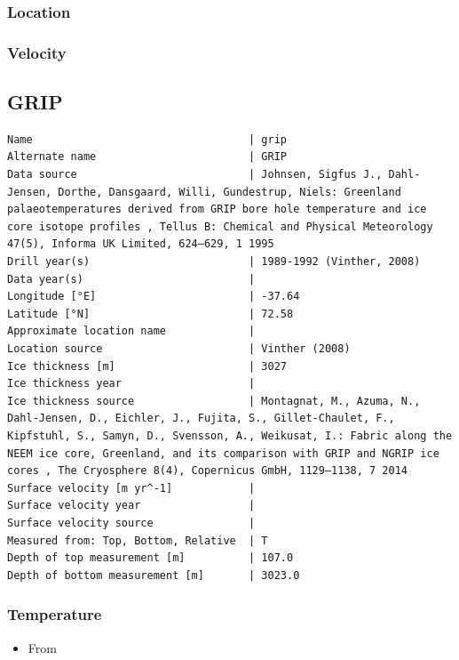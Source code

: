 \documentclass[article,a4paper,times,11pt,twoside]{article}
\begin{document}
\subsubsection{Location}
\label{sec:org9dd43f0}

\subsubsection{Velocity}
\label{sec:org24aabc6}
\clearpage
\subsection{GRIP}
\label{sec:orgd58e850}
\begin{verbatim}
Name                                  | grip
Alternate name                        | GRIP
Data source                           | Johnsen, Sigfus J., Dahl-Jensen, Dorthe, Dansgaard, Willi, Gundestrup, Niels: Greenland palaeotemperatures derived from GRIP bore hole temperature and ice core isotope profiles , Tellus B: Chemical and Physical Meteorology 47(5), Informa UK Limited, 624–629, 1 1995 
Drill year(s)                         | 1989-1992 (Vinther, 2008)
Data year(s)                          | 
Longitude [°E]                        | -37.64
Latitude [°N]                         | 72.58
Approximate location name             | 
Location source                       | Vinther (2008)
Ice thickness [m]                     | 3027
Ice thickness year                    | 
Ice thickness source                  | Montagnat, M., Azuma, N., Dahl-Jensen, D., Eichler, J., Fujita, S., Gillet-Chaulet, F., Kipfstuhl, S., Samyn, D., Svensson, A., Weikusat, I.: Fabric along the NEEM ice core, Greenland, and its comparison with GRIP and NGRIP ice cores , The Cryosphere 8(4), Copernicus GmbH, 1129–1138, 7 2014 
Surface velocity [m yr^-1]            | 
Surface velocity year                 | 
Surface velocity source               | 
Measured from: Top, Bottom, Relative  | T
Depth of top measurement [m]          | 107.0
Depth of bottom measurement [m]       | 3023.0
\end{verbatim}

\subsubsection{Temperature}
\label{sec:orgc948f1b}

\begin{itemize}
\item From \textcite{johnsen_1995}
\end{itemize}
\end{document}
